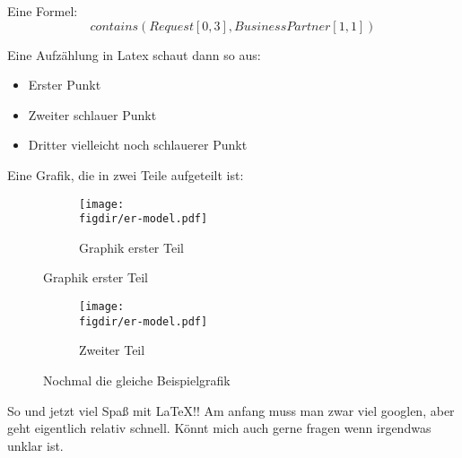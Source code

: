 Eine Formel:
\begin{equation}
\label{eq:kardinalität}
contains(Request[0,3], BusinessPartner[1,1])
\end{equation}

Eine Aufzählung in Latex schaut dann so aus:
\begin{itemize}
  \item Erster Punkt
  \item Zweiter schlauer Punkt
  \item Dritter vielleicht noch schlauerer Punkt
\end{itemize}

Eine Grafik, die in zwei Teile aufgeteilt ist:

\begin{figure}[ht]
\centering
\begin{subfigure}{\textwidth}
\caption{Graphik erster Teil}
\texttt{[image: \\figdir/er-model.pdf]}
\end{subfigure}
\end{figure}

\begin{figure}[H]
\ContinuedFloat
\centering
\begin{subfigure}{\textwidth}
\caption{Zweiter Teil}
\texttt{[image: \\figdir/er-model.pdf]}
\end{subfigure}
\caption{Nochmal die gleiche Beispielgrafik}
\label{fig:workflow}
\end{figure}

So und jetzt viel Spaß mit \LaTeX!! Am anfang muss man zwar viel googlen, aber geht eigentlich relativ schnell. Könnt mich auch gerne fragen wenn irgendwas unklar ist.
